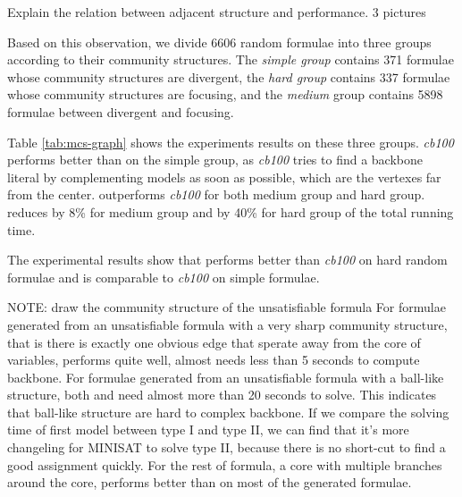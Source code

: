 Explain the relation between adjacent structure and performance.
3 pictures

Based on this observation, we divide 6606 random formulae into three groups according to their community structures.
The \emph{simple group} contains 371 formulae whose community structures are divergent,
the \emph{hard group} contains 337 formulae whose community structures are focusing,
and the \emph{medium} group contains 5898 formulae between divergent and focusing.


Table \ref{tab:mcs-graph} shows the experiments results on these three groups. \textit{cb100} performs better than \tool on the simple group, as \textit{cb100} tries to find a backbone literal by complementing models as soon as possible, which are the vertexes far from the center.
\tool outperforms \textit{cb100} for both medium group and hard group.
\tool reduces by 8\% for medium group and by 40\% for hard group of the total running time.

The experimental results show that \tool performs better than \textit{cb100} on hard random formulae and is comparable to \textit{cb100} on simple formulae.

NOTE: draw the community structure of the unsatisfiable formula
For formulae generated from an unsatisfiable formula with a very sharp community structure, that is there is exactly one obvious edge that sperate away from the core of variables, \tool performs quite well, almost needs less than 5 seconds to compute backbone.
For formulae generated from an unsatisfiable formula with a ball-like structure, both \tool and \minibones need almost more than 20 seconds to solve. This indicates that ball-like structure are hard to complex backbone. If we compare the solving time of first model between type I and type II, we can find that it's more changeling for MINISAT to solve type II, because there is no short-cut to find a good assignment quickly.
For the rest of formula, a core with multiple branches around the core, \tool performs better than \minibones on most of the generated formulae.


